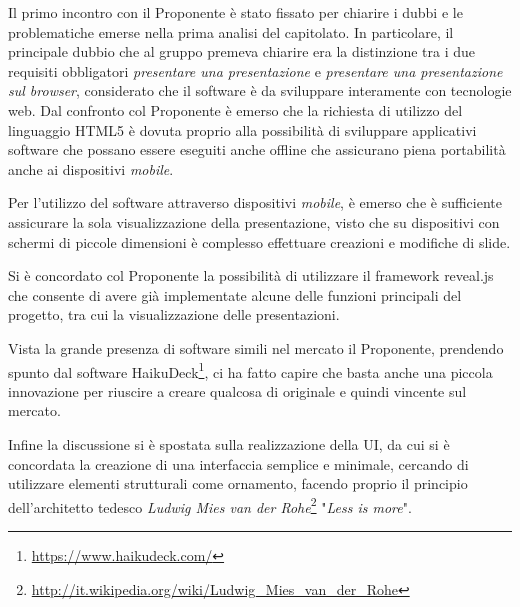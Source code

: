 Il primo incontro con il Proponente è stato fissato per chiarire i dubbi e le problematiche emerse nella prima analisi del capitolato. In particolare, il principale dubbio che al gruppo premeva chiarire era la distinzione tra i due requisiti obbligatori \textit{presentare una presentazione} e \textit{presentare una presentazione sul \gls{browser}}, considerato che il software è da sviluppare interamente con tecnologie web. Dal confronto col Proponente è emerso che la richiesta di utilizzo del linguaggio \gls{HTML5} è dovuta proprio alla possibilità di sviluppare applicativi software che possano essere eseguiti anche offline che assicurano piena portabilità anche ai dispositivi \textit{mobile}. 

\noindent Per l'utilizzo del software \PROGETTO{} attraverso dispositivi \textit{mobile}, è emerso che è sufficiente assicurare la sola visualizzazione della presentazione, visto che su dispositivi con schermi di piccole dimensioni è complesso effettuare creazioni e modifiche di slide.

\noindent Si è concordato col Proponente la possibilità di utilizzare il framework \gls{reveal.js} che consente di avere già implementate alcune delle funzioni principali del progetto, tra cui la visualizzazione delle presentazioni.

\noindent Vista la grande presenza di software simili nel mercato il Proponente, prendendo spunto dal software HaikuDeck\footnote{\url{https://www.haikudeck.com/}}, ci ha fatto capire che basta anche una piccola innovazione per riuscire a creare qualcosa di originale e quindi vincente sul mercato. 

\noindent Infine la discussione si è spostata sulla realizzazione della \gls{UI}, da cui si è concordata la creazione di una interfaccia semplice e minimale, cercando di utilizzare elementi strutturali come ornamento, facendo proprio il principio dell'architetto tedesco \textit{Ludwig Mies van der Rohe}\footnote{\url{http://it.wikipedia.org/wiki/Ludwig_Mies_van_der_Rohe}} "\textit{Less is more}". 

